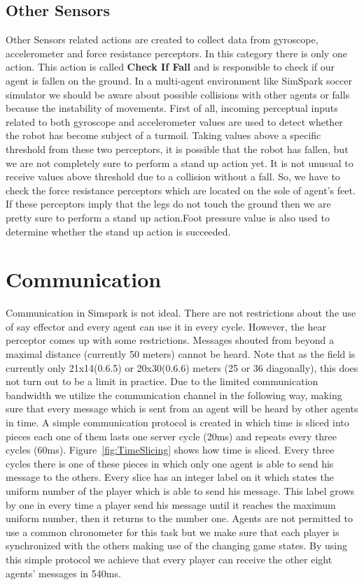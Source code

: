 \subsection{Other Sensors}

Other Sensors related actions are created to collect data from gyroscope, accelerometer and force resistance perceptors. In this category there is only one action. This action is called {\bf Check If Fall} and is responsible to check if our agent is fallen on the ground. In a multi-agent environment like SimSpark soccer simulator we should be aware about possible collisions with other agents or falls because the instability of movements. First of all, incoming perceptual inputs related to both gyroscope and accelerometer values are used to detect whether the robot has become subject of a turmoil. Taking values above a specific threshold from these two perceptors, it is possible that the robot has fallen, but we are not completely sure to perform a stand up action yet. It is not unusual to receive values above threshold due to a collision without a fall. So, we have to check the force resistance perceptors which are located on the sole of agent's feet. If these perceptors imply that the legs do not touch the ground then we are pretty sure to perform a stand up action.Foot pressure value is also used to determine whether the stand up action is succeeded.


\section{Communication}
Communication in Simspark is not ideal. There are not restrictions about the use of say effector and every agent can use it in every cycle. However, the hear perceptor comes up with some restrictions. Messages shouted from beyond a maximal distance (currently 50 meters) cannot be heard. Note that as the field is currently only 21x14(0.6.5) or 20x30(0.6.6) meters (25 or 36 diagonally), this does not turn out to be a limit in practice. Due to the limited communication bandwidth we utilize the communication channel in the following way, making sure that every message which is sent from an agent will be heard by other agents in time. A simple communication protocol is created in which time is sliced into pieces each one of them lasts one server cycle (20ms) and repeats every three cycles (60ms). Figure~\ref{fig:TimeSlicing} shows how time is sliced. Every three cycles there is one of these pieces in which only one agent is able to send his message to the others. Every slice has an integer label on it which states the uniform number of the player which is able to send his message. This label grows by one in every time a player send his message until it reaches the maximum uniform number, then it returns to the number one. Agents are not permitted to use a common chronometer for this task but we make sure that each player is synchronized with the others making use of the changing game states. By using this simple protocol we achieve that every player can receive the other eight agents' messages in 540ms.

